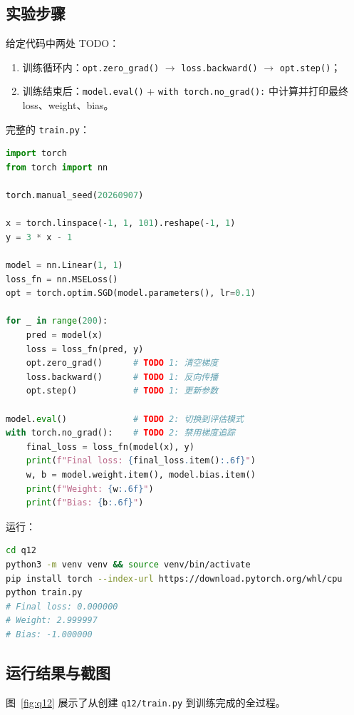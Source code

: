 \documentclass[a4paper,11pt]{ctexart}
\begin{document}
\subsection{实验步骤}

给定代码中两处 TODO：
\begin{enumerate}
  \item 训练循环内：\texttt{opt.zero\_grad()} $\to$ \texttt{loss.backward()} $\to$ \texttt{opt.step()}；
  \item 训练结束后：\texttt{model.eval()} + \texttt{with torch.no\_grad():} 中计算并打印最终 loss、weight、bias。
\end{enumerate}

完整的 \texttt{train.py}：

\begin{lstlisting}[language=Python]
import torch
from torch import nn

torch.manual_seed(20260907)

x = torch.linspace(-1, 1, 101).reshape(-1, 1)
y = 3 * x - 1

model = nn.Linear(1, 1)
loss_fn = nn.MSELoss()
opt = torch.optim.SGD(model.parameters(), lr=0.1)

for _ in range(200):
    pred = model(x)
    loss = loss_fn(pred, y)
    opt.zero_grad()      # TODO 1: 清空梯度
    loss.backward()      # TODO 1: 反向传播
    opt.step()           # TODO 1: 更新参数

model.eval()             # TODO 2: 切换到评估模式
with torch.no_grad():    # TODO 2: 禁用梯度追踪
    final_loss = loss_fn(model(x), y)
    print(f"Final loss: {final_loss.item():.6f}")
    w, b = model.weight.item(), model.bias.item()
    print(f"Weight: {w:.6f}")
    print(f"Bias: {b:.6f}")
\end{lstlisting}

运行：

\begin{lstlisting}[language=bash]
cd q12
python3 -m venv venv && source venv/bin/activate
pip install torch --index-url https://download.pytorch.org/whl/cpu
python train.py
# Final loss: 0.000000
# Weight: 2.999997
# Bias: -1.000000
\end{lstlisting}

\subsection{运行结果与截图}

图~\ref{fig:q12} 展示了从创建 \texttt{q12/train.py} 到训练完成的全过程。
\end{document}
